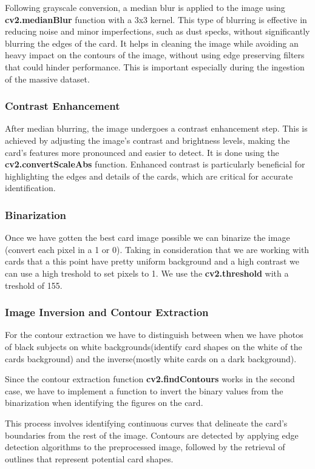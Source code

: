 \documentclass[twocolumn, a4paper,10pt]{article}
\begin{document}
Following grayscale conversion, a median blur is applied to the image using \textbf{cv2.medianBlur} function with a 3x3 kernel. This type of blurring is effective in reducing noise and minor imperfections, such as dust specks, without significantly blurring the edges of the card. It helps in cleaning the image while avoiding an heavy impact on the contours of the image, without using edge preserving filters that could hinder performance. This is important especially during the ingestion of the massive dataset.

\subsubsection*{Contrast Enhancement}
After median blurring, the image undergoes a contrast enhancement step. This is achieved by adjusting the image's contrast and brightness levels, making the card's features more pronounced and easier to detect. It is done using the \textbf{cv2.convertScaleAbs} function. Enhanced contrast is particularly beneficial for highlighting the edges and details of the cards, which are critical for accurate identification.

\subsubsection*{Binarization}
Once we have gotten the best card image possible we can binarize the image (convert each pixel in a 1 or 0). Taking in consideration that we are working with cards that a this point have pretty uniform background and a high contrast we can use a high treshold to set pixels to 1. We use the \textbf{cv2.threshold}  with a treshold of 155.

\subsubsection*{Image Inversion and Contour Extraction}
For the contour extraction we have to distinguish between when we have photos of black subjects on white backgrounds(identify card shapes on the white of the cards background) and the inverse(mostly white cards on a dark background).

Since the contour extraction function \textbf{cv2.findContours} works in the second case, we have to implement a function to invert the binary values from the binarization when identifying the figures on the card.

This process involves identifying continuous curves that delineate the card's boundaries from the rest of the image. Contours are detected by applying edge detection algorithms to the preprocessed image, followed by the retrieval of outlines that represent potential card shapes.
\end{document}
